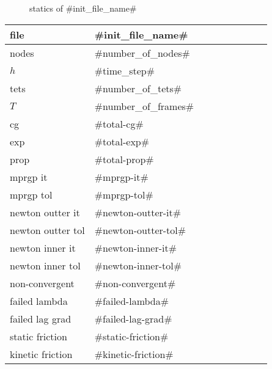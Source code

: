 
\begin{figure}
  \centering
  \caption{statics of #init_file_name#}
  \label{en_f}
\end{figure}

\begin{center}
  \begin{tabular}{|l*{8}{|l}}
    \hline
	file & #init_file_name# \\ \hline
	nodes & #number_of_nodes# \\ \hline
	$h$ & #time_step# \\ \hline
	tets & #number_of_tets# \\ \hline
	$T$ & #number_of_frames# \\ \hline
	cg & #total-cg# \\ \hline
	exp & #total-exp# \\ \hline
	prop & #total-prop# \\ \hline
    mprgp it & #mprgp-it# \\ \hline
	mprgp tol & #mprgp-tol# \\ \hline
    newton outter it & #newton-outter-it# \\ \hline
	newton outter tol & #newton-outter-tol# \\ \hline
	newton inner it & #newton-inner-it# \\ \hline
	newton inner tol & #newton-inner-tol# \\ \hline
    non-convergent & #non-convergent# \\ \hline
    failed lambda & #failed-lambda# \\ \hline
    failed lag grad & #failed-lag-grad# \\ \hline
    static friction & #static-friction# \\ \hline
    kinetic friction & #kinetic-friction# \\ \hline
  \end{tabular}
\end{center}
